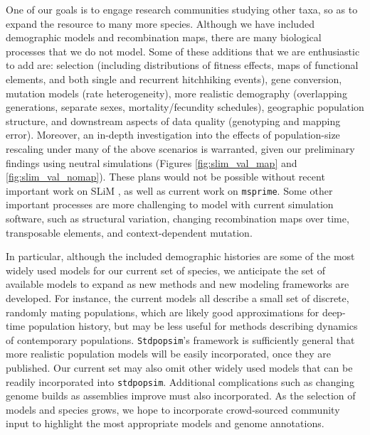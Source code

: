 \documentclass[12pt,halfline,a4paper]{ouparticle}
\newcommand{\Stdpopsim}{\texttt{Stdpopsim}\xspace}
\newcommand{\stdpopsim}{\texttt{stdpopsim}\xspace}
\begin{document}
One of our goals is to engage research communities studying other taxa,
so as to expand the resource to many more species.
Although we have included demographic models and recombination maps,
there are many biological processes that we do not model.
Some of these additions that we are enthusiastic to add are:
selection (including distributions of fitness effects, maps of functional elements, and both single and recurrent hitchhiking events),
gene conversion, mutation models (rate heterogeneity),
more realistic demography (overlapping generations, separate sexes, mortality/fecundity schedules),
geographic population structure,
and downstream aspects of data quality (genotyping and mapping error).
Moreover, an in-depth investigation into the effects of population-size rescaling under many of the
above scenarios is warranted, given our preliminary findings using neutral simulations
(Figures \ref{fig:slim_val_map} and \ref{fig:slim_val_nomap}).
These plans would not be possible without recent important work on SLiM \citep{haller2019slim},
as well as current work on \texttt{msprime}.
Some other important processes are more challenging to model with current simulation software,
such as
structural variation,
changing recombination maps over time,
transposable elements,
and context-dependent mutation.

In particular, although the included demographic histories are some of the most widely used models for our current set of species,
we anticipate the set of available models to expand
as new methods and new modeling frameworks are developed.
For instance, the current models all describe a small set of discrete, randomly mating populations,
which are likely good approximations for deep-time population history,
but may be less useful for methods describing dynamics of contemporary populations.
\Stdpopsim's framework is sufficiently general that more realistic population models
will be easily incorporated, once they are published.
Our current set may also omit other widely used models that can be readily incorporated into \stdpopsim.
Additional complications such as changing
genome builds as assemblies improve must also incorporated.
As the selection of models and species grows, we hope to
incorporate crowd-sourced community input
to highlight the most appropriate models and genome annotations.
\end{document}
